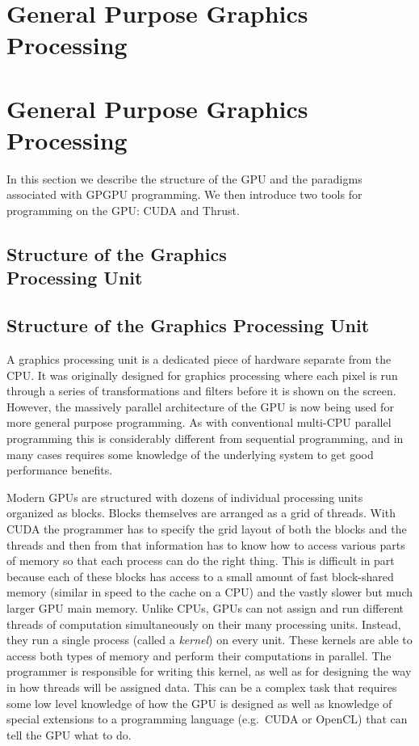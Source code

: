\documentclass[twocolumn]{article}
\renewcommand{\|}{\origbar} %
\begin{document}
\if@twocolumn
  \section{General Purpose Graphics \\ Processing}
\else
  \section{General Purpose Graphics Processing}
\fi 
\label{sec:GPGP}

In this section we describe the structure of the GPU and the paradigms associated with GPGPU programming. We then introduce two tools for programming on the GPU: CUDA and Thrust.

\if@twocolumn
  \subsection{Structure of the Graphics \\ Processing Unit}
\else
  \subsection{Structure of the Graphics Processing Unit}
\fi

A graphics processing unit is a dedicated piece of hardware separate from the CPU. It was originally designed for graphics processing where each pixel is run through a series of transformations and filters before it is shown on the screen. However, the massively parallel architecture of the GPU is now being used for more general purpose programming. As with conventional multi-CPU parallel programming this is considerably different from sequential programming, and in many cases requires some knowledge of the underlying system to get good performance benefits. 

Modern GPUs are structured with dozens of individual processing units organized as blocks. Blocks themselves are arranged as a grid of threads. With CUDA the programmer has to specify the grid layout of both the blocks and the threads and then from that information has to know how to access various parts of memory so that each process can do the right thing. This is difficult in part because each of these blocks has access to a small amount of fast block-shared memory (similar in speed to the cache on a CPU) and the vastly slower but much larger GPU main memory. Unlike CPUs, GPUs can not assign and run different threads of computation simultaneously on their many processing units. Instead, they run a single process (called a {\em kernel}) on every unit. These kernels are able to access both types of memory and perform their computations in parallel. The programmer is responsible for writing this kernel, as well as for designing the way in how threads will be assigned data. This can be a complex task that requires some low level knowledge of how the GPU is designed as well as knowledge of special extensions to a programming language (e.g.\ CUDA or OpenCL) that can tell the GPU what to do.
\end{document}
